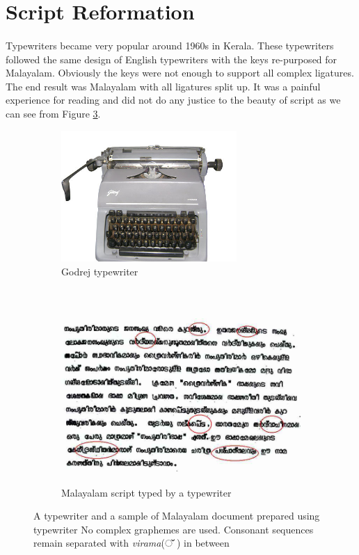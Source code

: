 \documentclass[10pt]{article}
\begin{document}
\section{Script Reformation}

\paragraph{}
Typewriters became very popular around 1960s in Kerala. These typewriters followed the same design of English typewriters with the keys re-purposed for Malayalam. Obviously the keys were not enough to support all complex ligatures. The end result was Malayalam with all ligatures split up. It was a painful experience for reading and did not do any justice to the beauty of script as we can see from Figure \ref{typewriter}.

\begin{figure}[h!]
	\centering
	\begin{subfigure}{.7\textwidth}
		\centering
		\includegraphics[width=\linewidth, height=5cm]{images/godrej-typewriter.jpg}
		\caption{Godrej typewriter}
		\label{godrej}
	\end{subfigure}%
	\\
	\begin{subfigure}{\textwidth}
		\centering
		\includegraphics[width=\linewidth,height=6.5cm]{images/typewritertext4.jpg}
		\caption{Malayalam script typed by a typewriter}
		\label{typewritertext}
	\end{subfigure}
	\caption{A typewriter and a sample of Malayalam document prepared using typewriter No complex graphemes are used. Consonant sequences remain separated with \textit{virama}({\manjari ് }) in between}
	\label{typewriter}
\end{figure}
\end{document}
